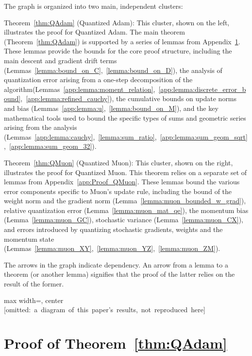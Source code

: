 \documentclass[11pt, letterpaper]{article}
\begin{document}
The graph is organized into two main, independent clusters:

Theorem~\ref{thm:QAdam} (Quantized Adam): This cluster, shown on the left, illustrates the proof for Quantized Adam. The main theorem (Theorem~\ref{thm:QAdam}) is supported by a series of lemmas from Appendix~\ref{app:Proof_QAdam}. These lemmas provide the bounds for the core proof structure, including the main descent and gradient drift terms (Lemmas~\ref{lemma:bound_on_C},~\ref{lemma:bound_on_D}), the analysis of quantization error arising from a one-step decomposition of the algorithm(Lemmas~\ref{app:lemma:moment_relation},~\ref{app:lemma:discrete_error_bound},~\ref{app:lemma:refined_cauchy}), the cumulative bounds on update norms and bias (Lemmas~\ref{app:lemma:u},~\ref{lemma:bound_on_M}), and the key mathematical tools used to bound the specific types of sums and geometric series arising from the analysis (Lemmas~\ref{app:lemma:cauchy},~\ref{lemma:sum_ratio},~\ref{app:lemma:sum_geom_sqrt},~\ref{app:lemma:sum_geom_32}).


Theorem~\ref{thm:QMuon} (Quantized Muon): This cluster, shown on the right, illustrates the proof for Quantized Muon. This theorem relies on a separate set of lemmas from Appendix~\ref{app:Proof_QMuon}. These lemmas bound the various error components specific to Muon's update rule, including the bound of the weight norm and the gradient norm (Lemma~\ref{lemma:muon_bounded_w_grad}), relative quantization error (Lemma~\ref{lemma:muon_mat_qe}), the momentum bias (Lemma~\ref{lemma:muon_GC}), stochastic variance (Lemma~\ref{lemma:muon_CX}), and errors introduced by quantizing stochastic gradients, weights and the momentum state (Lemmas~\ref{lemma:muon_XY},~\ref{lemma:muon_YZ},~\ref{lemma:muon_ZM}).

The arrows in the graph indicate dependency. An arrow from a lemma to a theorem (or another lemma) signifies that the proof of the latter relies on the result of the former.

\vspace{0.5cm}
\begin{adjustbox}{max width=\textwidth, center}
\mbox{[omitted: a diagram of this paper's results, not reproduced here]}
\end{adjustbox}%

\newpage
\tableofcontents
\resettocdepth{}
\newpage

\section{Proof of Theorem~\ref{thm:QAdam}}\label{app:Proof_QAdam}
\end{document}
